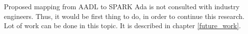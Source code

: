 Proposed mapping from AADL to SPARK Ada is not consulted with industry engineers. Thus, it would be first thing to do, in order to continue this research. Lot of work can be done in this topic. It is described in chapter \ref{future_work}.